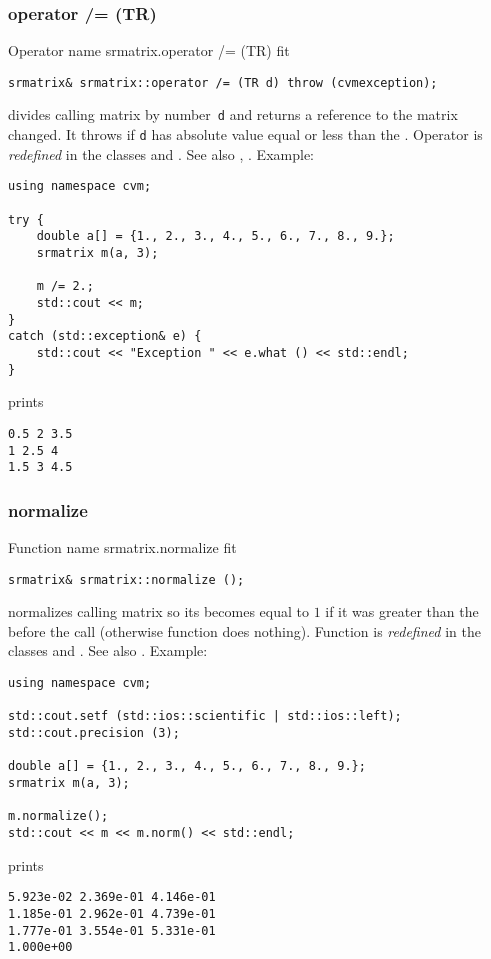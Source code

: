 \subsubsection{operator /= (TR)}
Operator%
\pdfdest name {srmatrix.operator /= (TR)} fit
\begin{verbatim}
srmatrix& srmatrix::operator /= (TR d) throw (cvmexception);
\end{verbatim}
divides  calling matrix by  number~\verb"d"
and returns a reference to
the matrix changed.
It throws  
if \verb"d" has  absolute value equal or less
than the 
.
Operator is \emph{redefined} in the classes
and .
See also ,
.
Example:
\begin{Verbatim}
using namespace cvm;

try {
    double a[] = {1., 2., 3., 4., 5., 6., 7., 8., 9.};
    srmatrix m(a, 3);

    m /= 2.;
    std::cout << m;
}
catch (std::exception& e) {
    std::cout << "Exception " << e.what () << std::endl;
}
\end{Verbatim}
prints
\begin{Verbatim}
0.5 2 3.5
1 2.5 4
1.5 3 4.5
\end{Verbatim}
\newpage


\subsubsection{normalize}
Function%
\pdfdest name {srmatrix.normalize} fit
\begin{verbatim}
srmatrix& srmatrix::normalize ();
\end{verbatim}
normalizes  calling matrix so its 
becomes equal to $1$ if it was greater than the 
before the call (otherwise function does nothing).
Function is \emph{redefined} in the classes
and .
See also .
Example:
\begin{Verbatim}
using namespace cvm;

std::cout.setf (std::ios::scientific | std::ios::left); 
std::cout.precision (3);

double a[] = {1., 2., 3., 4., 5., 6., 7., 8., 9.};
srmatrix m(a, 3);

m.normalize();
std::cout << m << m.norm() << std::endl;
\end{Verbatim}
prints
\begin{Verbatim}
5.923e-02 2.369e-01 4.146e-01
1.185e-01 2.962e-01 4.739e-01
1.777e-01 3.554e-01 5.331e-01
1.000e+00
\end{Verbatim}
\newpage



